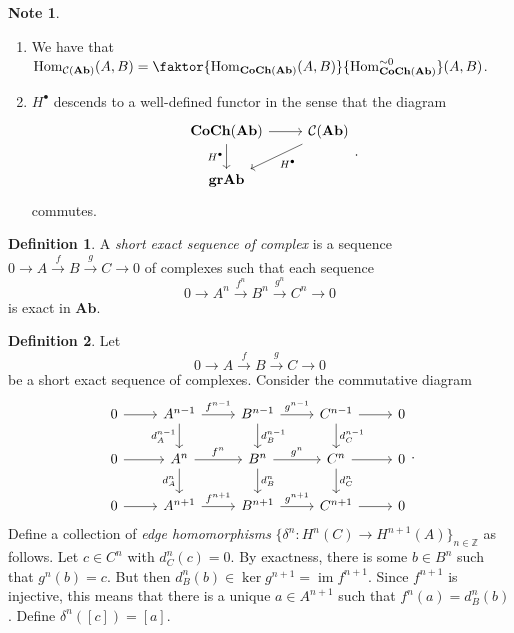 \documentclass[10pt,letterpaper,cm]{nupset}
\theoremstyle{definition}
\newtheorem*{definition}{Definition}
\newtheorem{note}{Note}
\newcommand{\Z}{\mathbb Z}
\newcommand{\1}{\mathbf{1}}
\newcommand{\0}{\vec 0}
\DeclareMathOperator{\im}{im}
\DeclareMathOperator{\Hom}{Hom}
\begin{document}
\begin{note} $ $
\begin{enumerate}
\item We have that $\Hom_{\mathcal{C}(\mathbf{Ab})}(A, B) = \faktor{\Hom_{\mathbf{CoCh(Ab)}}(A, B)}{\Hom_{\mathbf{CoCh(Ab)}}^{\sim 0}}(A, B)$.
\item $H^{\bullet}$ descends to a well-defined functor in the sense that the diagram
\[
\begin{tikzcd}
 \mathbf{CoCh(Ab)} \arrow[d, "H^{\bullet}"'] \arrow[r] &  \mathcal{C}(\mathbf{Ab}) \arrow[ld, "H^{\bullet}"] \\
\mathbf{grAb}                                          &                                  
\end{tikzcd}
. \]
commutes.
\end{enumerate}
\end{note}

\begin{definition}
A \textit{short exact sequence of complex} is a sequence $0 \to A \overset{f}{\longrightarrow} B \overset{g}{\longrightarrow} C \to 0$ of complexes such that each sequence $$0 \to A^n \overset{f^n}{\longrightarrow} B^n \overset{g^n}{\longrightarrow} C^n \to 0$$ is exact in $\mathbf{Ab}$.
\end{definition}

\begin{definition}
Let $$0 \to A \overset{f}{\longrightarrow} B \overset{g}{\longrightarrow} C \to 0$$ be a short exact sequence of complexes. Consider the commutative diagram
 \[
 \begin{tikzcd}
0 \arrow[r] & A^{n-1} \arrow[r, "f^{n-1}"] \arrow[d, "d^{n-1}_A"'] & B^{n-1} \arrow[r, "g^{n-1}"] \arrow[d, "d_B^{n-1}"] & C^{n-1} \arrow[r] \arrow[d, "d_C^{n-1}"] & 0 \\
0 \arrow[r] & A^n \arrow[r, "f^n"] \arrow[d, "d_A^n"']             & B^n \arrow[r, "g^n"] \arrow[d, "d_B^n"]             & C^n \arrow[r] \arrow[d, "d_C^n"]         & 0 \\
0 \arrow[r] & A^{n+1} \arrow[r, "f^{n+1}"]                         & B^{n+1} \arrow[r, "g^{n+1}"]                        & C^{n+1} \arrow[r]                        & 0
\end{tikzcd}
 .\]
 Define a collection of \textit{edge homomorphisms} $\{\delta^n : H^n(C) \to H^{n+1}(A)\}_{n\in \Z}$ as follows. Let $c\in C^n$ with $d_C^n(c) =0$. By exactness, there is some $b\in B^n$ such that $g^n(b) =c$. But then $d_B^n(b) \in \ker{g^{n+1}} = \im{f^{n+1}}$. Since $f^{n+1}$ is injective, this means that there is a unique $a \in A^{n+1}$ such that $f^n(a) = d_B^n(b)$. Define $\delta^n([c]) = [a]$.
\end{definition}
\end{document}
